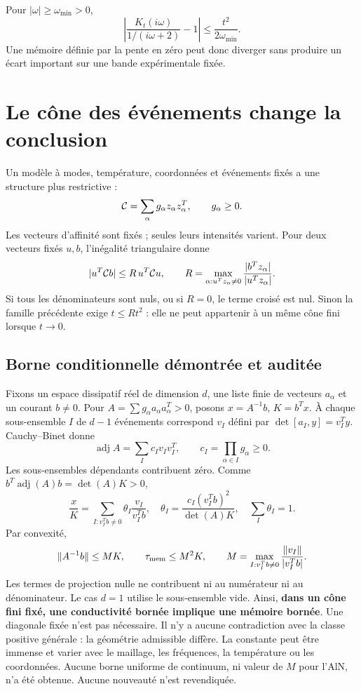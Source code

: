 \documentclass[11pt,a4paper]{article}
\begin{document}
Pour $|\omega|\ge\omega_{\min}>0$,
\[
 \left|\frac{K_t(i\omega)}{1/(i\omega+2)}-1\right|
 \le \frac{t^2}{2\omega_{\min}} .
\]
Une mémoire définie par la pente en zéro peut donc diverger sans produire un écart important sur une bande expérimentale fixée.


\section{Le cône des événements change la conclusion}
Un modèle à modes, température, coordonnées et événements fixés a une structure plus restrictive :
\[
 {\cal C}=\sum_\alpha g_\alpha z_\alpha z_\alpha^T,\qquad g_\alpha\ge0.
\]
Les vecteurs d'affinité sont fixés ; seules leurs intensités varient.
Pour deux vecteurs fixés $u,b$, l'inégalité triangulaire donne
\[
 |u^T{\cal C}b|\le R\,u^T{\cal C}u,\qquad
 R=\max_{\alpha:u^Tz_\alpha\ne0}
 \frac{|b^Tz_\alpha|}{|u^Tz_\alpha|}.
\]
Si tous les dénominateurs sont nuls, ou si $R=0$, le terme croisé est nul.
Sinon la famille précédente exige $t\le Rt^2$ : elle ne peut appartenir à un même cône fini lorsque $t\to0$.

\subsection{Borne conditionnelle démontrée et auditée}
Fixons un espace dissipatif réel de dimension $d$, une liste finie de vecteurs $a_\alpha$ et un courant $b\ne0$.
Pour $A=\sum g_\alpha a_\alpha a_\alpha^T>0$, posons $x=A^{-1}b$, $K=b^Tx$.
À chaque sous-ensemble $I$ de $d-1$ événements correspond $v_I$ défini par $\det[a_I,y]=v_I^Ty$.
Cauchy--Binet donne
\[
 \operatorname{adj}A=\sum_I c_Iv_Iv_I^T,\qquad c_I=\prod_{\alpha\in I}g_\alpha\ge0.
\]
Les sous-ensembles dépendants contribuent zéro. Comme
$b^T\operatorname{adj}(A)b=\det(A)K>0$,
\[
 \frac{x}{K}=\sum_{I:v_I^Tb\ne0}\theta_I\frac{v_I}{v_I^Tb},
 \quad \theta_I=\frac{c_I(v_I^Tb)^2}{\det(A)K},\quad \sum_I\theta_I=1.
\]
Par convexité,
\[
 \|A^{-1}b\|\le MK,\qquad
 \tau_{\rm mem}\le M^2K,\qquad
 M=\max_{I:v_I^Tb\ne0}\frac{\|v_I\|}{|v_I^Tb|}.
\]
Les termes de projection nulle ne contribuent ni au numérateur ni au dénominateur. Le cas $d=1$ utilise le sous-ensemble vide.
Ainsi, \textbf{dans un cône fini fixé, une conductivité bornée implique une mémoire bornée}. Une diagonale fixée n'est pas nécessaire.
Il n'y a aucune contradiction avec la classe positive générale : la géométrie admissible diffère.
La constante peut être immense et varier avec le maillage, les fréquences, la température ou les coordonnées.
Aucune borne uniforme de continuum, ni valeur de $M$ pour l'AlN, n'a été obtenue. Aucune nouveauté n'est revendiquée.
\end{document}
